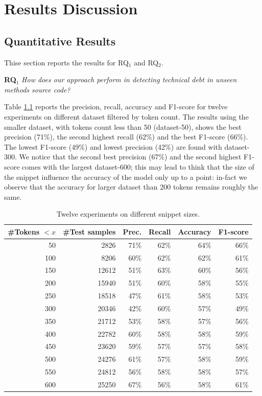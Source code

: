 \chapter{Results Discussion}


\section{Quantitative Results}
Thise section reports the results for {RQ$_1$} and {RQ$_2$}.

\textbf{RQ$_1$} \textit{How does our approach perform in detecting technical debt in unseen methods source code?} 

Table \ref{tbl:rq1} reports the precision, recall, accuracy and F1-score for twelve experiments on different dataset filtered by token count. The results using the smaller dataset, with tokens count less than 50 (dataset-50), shows the best precision (71\%), the second highest recall (62\%) and the best F1-score (66\%). The lowest F1-score (49\%) and lowest precision (42\%) are found with dataset-300. We notice that the second best precision (67\%) and the second highest F1-score comes with the largest dataset-600; this may lead to think that the size of the snippet influence the accuracy of the model only up to a point: in-fact we observe that the accuracy for larger dataset than 200 tokens remains roughly the same.

\begin{table}[h]
\centering
\caption{Twelve experiments on different snippet sizes.\label{tbl:rq1}}
\begin{tabular}{|r|r|r|r|r|r|}
\hline
\multicolumn{1}{|l|}{\#Tokens $< x$} &
  \multicolumn{1}{l|}{\#Test samples} &
  \multicolumn{1}{l|}{Prec.} &
  \multicolumn{1}{l|}{Recall} &
  \multicolumn{1}{l|}{Accuracy} &
  \multicolumn{1}{l|}{F1-score} \\ \hline
50  & 2826  & 71\% & 62\% & 64\% & 66\% \\ %
100 & 8206  & 60\% & 62\% & 62\% & 61\% \\
150 & 12612 & 51\% & 63\% & 60\% & 56\% \\
200 & 15940 & 51\% & 60\% & 58\% & 55\% \\ %
250 & 18518 & 47\% & 61\% & 58\% & 53\% \\
300 & 20346 & 42\% & 60\% & 57\% & 49\% \\
350 & 21712 & 53\% & 58\% & 57\% & 56\% \\
400 & 22782 & 60\% & 58\% & 58\% & 59\% \\ %
450 & 23620 & 59\% & 57\% & 57\% & 58\% \\
500 & 24276 & 61\% & 57\% & 58\% & 59\% \\
550 & 24812 & 56\% & 58\% & 58\% & 57\% \\
600 & 25250 & 67\% & 56\% & 58\% & 61\% \\
\hline
\end{tabular}
\end{table}


